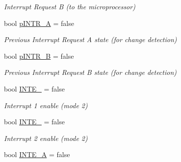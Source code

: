 \begin{DoxyCompactItemize}
\begin{DoxyCompactList}\small\item\em Interrupt Request B (to the microprocessor) \end{DoxyCompactList}\item 
\hypertarget{classIntel8255_a3f0b361bdd3b3e17f2e4155a562e97f6}{bool \hyperlink{classIntel8255_a3f0b361bdd3b3e17f2e4155a562e97f6}{p\-I\-N\-T\-R\-\_\-\-A} = false}\label{classIntel8255_a3f0b361bdd3b3e17f2e4155a562e97f6}

\begin{DoxyCompactList}\small\item\em Previous Interrupt Request A state (for change detection) \end{DoxyCompactList}\item 
\hypertarget{classIntel8255_a20fdff00b2ce0c6ff6853a812cb4bd9d}{bool \hyperlink{classIntel8255_a20fdff00b2ce0c6ff6853a812cb4bd9d}{p\-I\-N\-T\-R\-\_\-\-B} = false}\label{classIntel8255_a20fdff00b2ce0c6ff6853a812cb4bd9d}

\begin{DoxyCompactList}\small\item\em Previous Interrupt Request B state (for change detection) \end{DoxyCompactList}\item 
\hypertarget{classIntel8255_a86ff75a1d1c588498770aef868af1646}{bool \hyperlink{classIntel8255_a86ff75a1d1c588498770aef868af1646}{I\-N\-T\-E\-\_} = false}\label{classIntel8255_a86ff75a1d1c588498770aef868af1646}

\begin{DoxyCompactList}\small\item\em Interrupt 1 enable (mode 2) \end{DoxyCompactList}\item 
\hypertarget{classIntel8255_a3c4ae09573e23e4d7ebe5fd5974e7237}{bool \hyperlink{classIntel8255_a3c4ae09573e23e4d7ebe5fd5974e7237}{I\-N\-T\-E\-\_} = false}\label{classIntel8255_a3c4ae09573e23e4d7ebe5fd5974e7237}

\begin{DoxyCompactList}\small\item\em Interrupt 2 enable (mode 2) \end{DoxyCompactList}\item 
\hypertarget{classIntel8255_acb70507c44eaf7feb0e9d27a6a4546e8}{bool \hyperlink{classIntel8255_acb70507c44eaf7feb0e9d27a6a4546e8}{I\-N\-T\-E\-\_\-\-A} = false}\label{classIntel8255_acb70507c44eaf7feb0e9d27a6a4546e8}


\end{DoxyCompactItemize}
